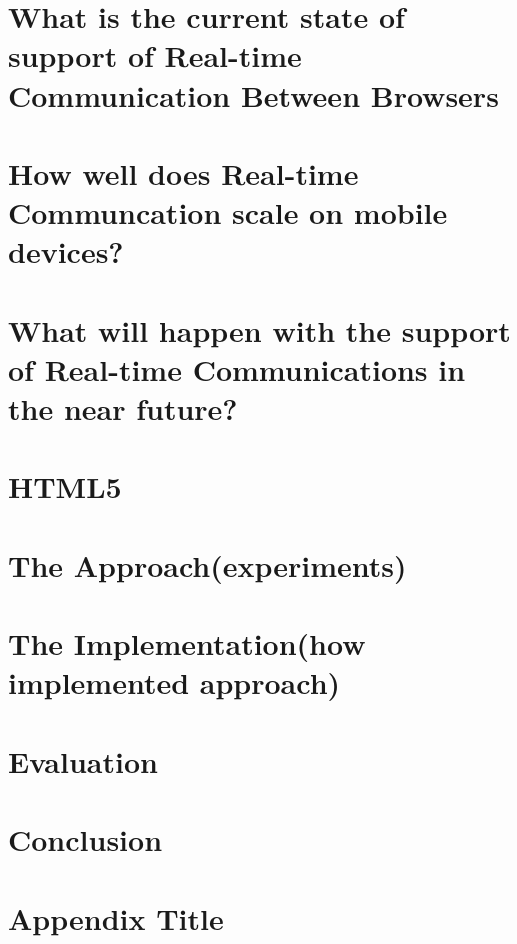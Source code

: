 \documentclass[11pt,a4paper]{report}
\begin{document}
\chapter{What is the current state of support of Real-time Communication Between Browsers}

\chapter{How well does Real-time Communcation scale on mobile devices?}

\chapter{What will happen with the support of Real-time Communications in the near future?}

\chapter{HTML5}

\chapter{The Approach(experiments)}%

\chapter{The Implementation(how implemented approach)}%

\chapter{Evaluation}%

\chapter{Conclusion}



\appendix
\chapter{Appendix Title}

\printglossaries
\end{document}
